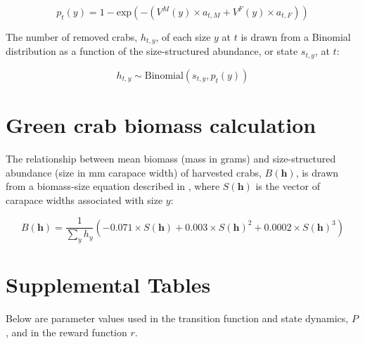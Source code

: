 \documentclass{article}
\begin{document}
\begin{equation}
p_t(y) = 1 - \text{exp}(-(V^M(y) \times a_{t,M} + V^F(y)\times a_{t,F})) 
\end{equation}

The number of removed crabs, $h_{t,y}$, of each size $y$ at $t$ is drawn from a Binomial distribution as a function of the size-structured abundance, or state $s_{t,y}$, at $t$:

\begin{equation}
h_{t,y} \sim \text{Binomial}(s_{t,y},p_t(y))
\end{equation}

\newpage

\section{Green crab biomass calculation}

The relationship between mean biomass (mass in grams) and size-structured abundance (size in mm carapace width) of harvested crabs, $B(\textbf{h})$, is drawn from a biomass-size equation described in \cite{grosholz2021stage}, where $S(\textbf{h})$ is the vector of carapace widths associated with size $y$:

\begin{equation}
B(\textbf{h}) = \frac{1}{\sum_yh_y} (-0.071\times S(\textbf{h}) + 0.003\times S(\textbf{h})^2 + 0.0002\times S(\textbf{h})^3) 
\end{equation}

\newpage


\section{Supplemental Tables}

Below are parameter values used in the transition function and state dynamics, $P$, and in the reward function $r$.
\end{document}
